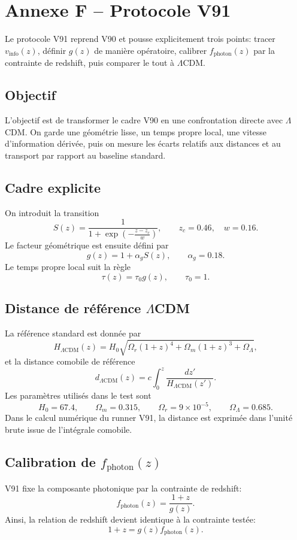 \section{Annexe F -- Protocole V91}
Le protocole V91 reprend V90 et pousse explicitement trois points: tracer $v_{\mathrm{info}}(z)$, définir $g(z)$ de manière opératoire, calibrer $f_{\mathrm{photon}}(z)$ par la contrainte de redshift, puis comparer le tout à $\Lambda$CDM.

\subsection{Objectif}
L'objectif est de transformer le cadre V90 en une confrontation directe avec $\Lambda$CDM. On garde une géométrie lisse, un temps propre local, une vitesse d'information dérivée, puis on mesure les écarts relatifs aux distances et au transport par rapport au baseline standard.

\subsection{Cadre explicite}
On introduit la transition
\[
S(z)=\frac{1}{1+\exp\!\left(-\frac{z-z_c}{w}\right)},
\qquad z_c=0.46,\quad w=0.16.
\]
Le facteur géométrique est ensuite défini par
\[
g(z)=1+\alpha_g S(z),
\qquad \alpha_g=0.18.
\]
Le temps propre local suit la règle
\[
\tau(z)=\tau_0 g(z),
\qquad \tau_0=1.
\]

\subsection{Distance de référence $\Lambda$CDM}
La référence standard est donnée par
\[
H_{\Lambda\mathrm{CDM}}(z)=H_0\sqrt{\Omega_r(1+z)^4+\Omega_m(1+z)^3+\Omega_\Lambda},
\]
et la distance comobile de référence
\[
d_{\Lambda\mathrm{CDM}}(z)=c\int_0^z \frac{dz'}{H_{\Lambda\mathrm{CDM}}(z')}.
\]
Les paramètres utilisés dans le test sont
\[
H_0=67.4,\qquad \Omega_m=0.315,\qquad \Omega_r=9\times10^{-5},\qquad \Omega_\Lambda=0.685.
\]
Dans le calcul numérique du runner V91, la distance est exprimée dans l'unité brute issue de l'intégrale comobile.

\subsection{Calibration de $f_{\mathrm{photon}}(z)$}
V91 fixe la composante photonique par la contrainte de redshift:
\[
f_{\mathrm{photon}}(z)=\frac{1+z}{g(z)}.
\]
Ainsi, la relation de redshift devient identique à la contrainte testée:
\[
1+z=g(z)f_{\mathrm{photon}}(z).
\]

